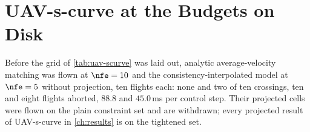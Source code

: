 \section{UAV-s-curve at the Budgets on Disk}\label{app:uav-scurve-budgets}

Before the grid of \autoref{tab:uav-scurve} was laid out, analytic average-velocity matching was flown
at $\nfe = 10$ and the consistency-interpolated model at $\nfe = 5$ without projection, ten flights
each: none and two of ten crossings, ten and eight flights aborted, $88.8$ and $45.0$\,ms per control
step. Their projected cells were flown on the plain constraint set and are withdrawn; every projected
result of UAV-s-curve in \autoref{ch:results} is on the tightened set.
\ifappendixfull

\else
\label{tab:app:uav-scurve-unprojected-extra}\label{tab:app:uav-scurve-aborts}\label{tab:app:uav-scurve-variants}
\fi

\FloatBarrier
